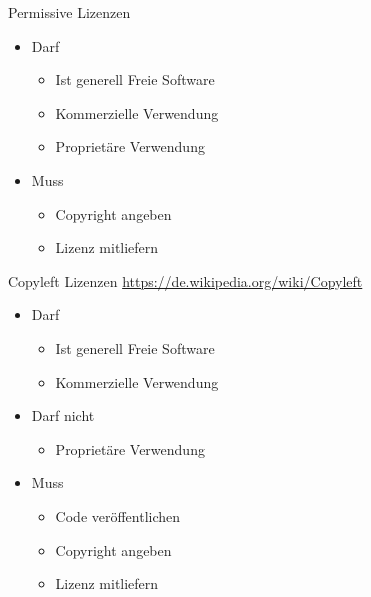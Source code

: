 \note
{
	Permissive Lizenzen
	\begin{itemize}
		\item Darf
		\begin{itemize}
			\item Ist generell Freie Software
			\item Kommerzielle Verwendung
			\item Proprietäre Verwendung
		\end{itemize}
		\item Muss
		\begin{itemize}
			\item Copyright angeben
			\item Lizenz mitliefern
		\end{itemize}
	\end{itemize}
}
\note
{
	Copyleft Lizenzen \url{https://de.wikipedia.org/wiki/Copyleft}
	\begin{itemize}
		\item Darf
		\begin{itemize}
			\item Ist generell Freie Software
			\item Kommerzielle Verwendung
		\end{itemize}
		\item Darf nicht
		\begin{itemize}
			\item Proprietäre Verwendung
		\end{itemize}
		\item Muss
		\begin{itemize}
			\item Code veröffentlichen
			\item Copyright angeben
			\item Lizenz mitliefern
		\end{itemize}
	\end{itemize}
}

